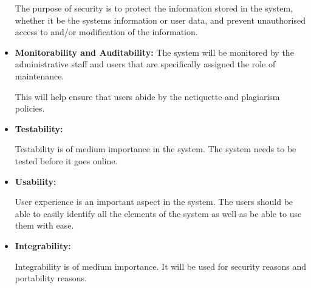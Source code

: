 \begin{flushleft}
\begin{itemize}
The purpose of security is to protect the information stored in the system, whether it be the systems information or user data, and prevent unauthorised access to and/or modification of the information.
\newline
 
		\item \textbf{Monitorability and Auditability:} 
The system will be monitored by the administrative staff and users that are specifically assigned the role of maintenance. \newline

This will help ensure that users abide by the netiquette and plagiarism policies.  \newline
			
		\item \textbf{Testability:} 
		
		Testability is of medium importance in the system. The system needs to be tested before it goes online. \newline
		
		
		\item \textbf{Usability:} 
		
		User experience is an important aspect in the system. The users should be able to easily identify all the elements of the system as well as be able to use them with ease. \newline
		

		\item \textbf{Integrability:} 
		
		Integrability is of medium importance. It will be used for security reasons and portability reasons. \newline
		
		
	\end{itemize}
	
\end{flushleft}

